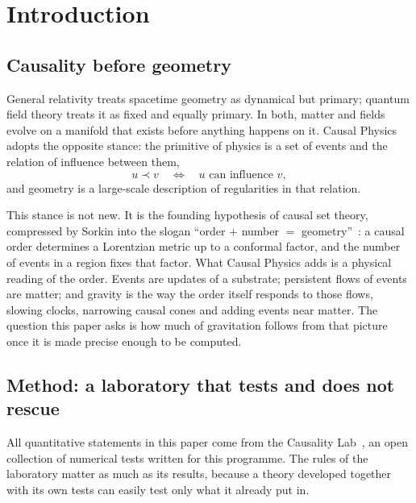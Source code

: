 \section{Introduction}\label{sec:intro}

\subsection{Causality before geometry}

General relativity treats spacetime geometry as dynamical but primary; quantum field theory treats it
as fixed and equally primary. In both, matter and fields evolve on a manifold that exists before
anything happens on it. Causal Physics adopts the opposite stance: the primitive of physics is a
set of events and the relation of influence between them,
\begin{equation}
  u \prec v \quad\Longleftrightarrow\quad u \text{ can influence } v ,
\end{equation}
and geometry is a large-scale description of regularities in that relation.

This stance is not new. It is the founding hypothesis of causal set theory, compressed by Sorkin
into the slogan ``order $+$ number $=$ geometry''~\cite{Bombelli1987,Surya2019}: a causal order
determines a Lorentzian metric up to a conformal factor, and the number of events in a region
fixes that factor. What Causal Physics adds is a physical reading of the order. Events are updates
of a substrate; persistent flows of events are matter; and gravity is the way the order itself
responds to those flows, slowing clocks, narrowing causal cones and adding events near matter. The
question this paper asks is how much of gravitation follows from that picture once it is made
precise enough to be computed.

\subsection{Method: a laboratory that tests and does not rescue}\label{sec:method}

All quantitative statements in this paper come from the Causality Lab~\cite{CausalityLab}, an open
collection of numerical tests written for this programme. The rules of the laboratory matter as
much as its results, because a theory developed together with its own tests can easily test only
what it already put in.

